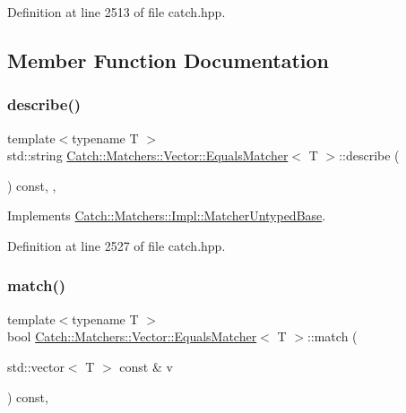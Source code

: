 Definition at line 2513 of file catch.\+hpp.



\subsection{Member Function Documentation}
\mbox{\label{struct_catch_1_1_matchers_1_1_vector_1_1_equals_matcher_a36b5f7ecada4081d6c65bebe8ddea6f4}} 
\subsubsection{\texorpdfstring{describe()}{describe()}}
{\footnotesize\ttfamily template$<$typename T $>$ \\
std\+::string \mbox{\hyperlink{struct_catch_1_1_matchers_1_1_vector_1_1_equals_matcher}{Catch\+::\+Matchers\+::\+Vector\+::\+Equals\+Matcher}}$<$ T $>$\+::describe (\begin{DoxyParamCaption}{ }\end{DoxyParamCaption}) const\hspace{0.3cm}{\ttfamily [inline]}, {\ttfamily [override]}, {\ttfamily [virtual]}}



Implements \mbox{\hyperlink{class_catch_1_1_matchers_1_1_impl_1_1_matcher_untyped_base_a91d3a907dbfcbb596077df24f6e11fe2}{Catch\+::\+Matchers\+::\+Impl\+::\+Matcher\+Untyped\+Base}}.



Definition at line 2527 of file catch.\+hpp.

\mbox{\label{struct_catch_1_1_matchers_1_1_vector_1_1_equals_matcher_a2d96cca58a44151fddc5257eda3305da}} 
\subsubsection{\texorpdfstring{match()}{match()}}
{\footnotesize\ttfamily template$<$typename T $>$ \\
bool \mbox{\hyperlink{struct_catch_1_1_matchers_1_1_vector_1_1_equals_matcher}{Catch\+::\+Matchers\+::\+Vector\+::\+Equals\+Matcher}}$<$ T $>$\+::match (\begin{DoxyParamCaption}\item[{std\+::vector$<$ T $>$ const \&}]{v }\end{DoxyParamCaption}) const\hspace{0.3cm}{\ttfamily [inline]}, {\ttfamily [override]}}



